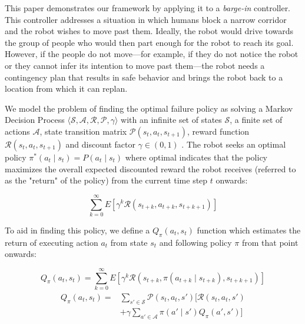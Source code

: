 \documentclass[letterpaper]{article}
\begin{document}
				This paper demonstrates our framework by applying it to a \textit{barge-in} controller. This controller addresses a situation in which humans block a narrow corridor and the robot wishes to move past them. Ideally, the robot would drive towards the group of people who would then part enough for the robot to reach its goal. However, if the people do not move---for example, if they do not notice the robot or they cannot infer its intention to move past them---the robot needs a contingency plan that results in safe behavior and brings the robot back to a location from which it can replan.
				
				We model the problem of finding the optimal failure policy as solving a Markov Decision Process $\langle\mathcal{S}, \mathcal{A}, \mathcal{R}, \mathcal{P}, \gamma\rangle$ with an infinite set of states $\mathcal{S}$, a finite set of actions $\mathcal{A}$, state transition matrix $\mathcal{P}(s_t, a_t, s_{t+1})$, reward function $\mathcal{R}(s_t, a_t, s_{t+1})$ and discount factor $\gamma \in (0, 1)$ \cite{suttonandbarto}. The robot seeks an optimal policy $\pi^*(a_t \mid s_t)=P(a_t \mid s_t)$ where optimal indicates that the policy maximizes the overall expected discounted reward the robot receives (referred to as the "return" of the policy) from the current time step $t$ onwards:
				
				\begin{equation}\label{eq:discountedreturn}
					\sum_{k=0}^{\infty}E[\gamma^k \mathcal{R}(s_{t+k}, a_{t+k}, s_{t+k+1})]
				\end{equation}
				
				To aid in finding this policy, we define a $Q_{\pi}(a_t, s_t)$ function which estimates the return of executing action $a_t$ from state $s_t$ and following policy $\pi$ from that point onwards:
				
				\begin{equation}\label{eq:q}
					Q_{\pi}(a_t, s_t) = 
					\sum_{k=0}^{\infty}E[\gamma^k \mathcal{R}(s_{t+k}, \pi(a_{t+k} \mid s_{t+k}), s_{t+k+1})]
				\end{equation}
				\begin{align}
					\begin{split}\label{eq:bellmanexpect}
						Q_{\pi}(a_t, s_t) =& 
						\sum_{s'\in \mathcal{S}}\mathcal{P}(s_t, a_t, s')[\mathcal{R}(s_t, a_t, s') \\
						&+ \gamma \sum_{a'\in \mathcal{A}}\pi(a'\mid s')Q_{\pi}(a', s')]
					\end{split}
				\end{align}
				
\end{document}
